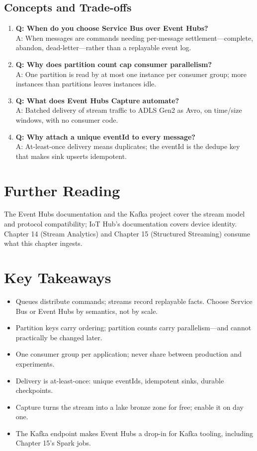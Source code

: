 \subsection{Concepts and Trade-offs}
\begin{enumerate}
    \item \textbf{Q: When do you choose Service Bus over Event Hubs?}\\
    A: When messages are commands needing per-message settlement---complete, abandon, dead-letter---rather than a replayable event log.
    \item \textbf{Q: Why does partition count cap consumer parallelism?}\\
    A: One partition is read by at most one instance per consumer group; more instances than partitions leaves instances idle.
    \item \textbf{Q: What does Event Hubs Capture automate?}\\
    A: Batched delivery of stream traffic to ADLS Gen2 as Avro, on time/size windows, with no consumer code.
    \item \textbf{Q: Why attach a unique eventId to every message?}\\
    A: At-least-once delivery means duplicates; the eventId is the dedupe key that makes sink upserts idempotent.
\end{enumerate}

\section{Further Reading}
The Event Hubs documentation \cite{microsoft2025eventhubs} and the Kafka project \cite{apache2025kafka} cover the stream model and protocol compatibility; IoT Hub's documentation \cite{microsoft2025iothub} covers device identity. Chapter 14 (Stream Analytics) and Chapter 15 (Structured Streaming) consume what this chapter ingests.

\section*{Key Takeaways}
\begin{itemize}
    \item Queues distribute commands; streams record replayable facts. Choose Service Bus or Event Hubs by semantics, not by scale.
    \item Partition keys carry ordering; partition counts carry parallelism---and cannot practically be changed later.
    \item One consumer group per application; never share between production and experiments.
    \item Delivery is at-least-once: unique eventIds, idempotent sinks, durable checkpoints.
    \item Capture turns the stream into a lake bronze zone for free; enable it on day one.
    \item The Kafka endpoint makes Event Hubs a drop-in for Kafka tooling, including Chapter 15's Spark jobs.
\end{itemize}

